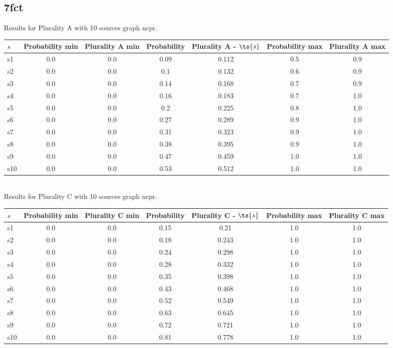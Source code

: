 \documentclass{article}
\begin{document}
\newpage

\subsection{7fct}

\noindent Results for Plurality A with 10 sources graph ncpr.

\noindent\begin{tabular}{|l|c|c|c|c|c|c|}
\hline
$s$& Probability min & Plurality A min & Probability & Plurality A - $\ts{s}$ & Probability max & Plurality A max\\
\hline
s1 &0.0 & 0.0 & 0.09 & 0.112 & 0.5 & 0.9\\
\hline
s2 &0.0 & 0.0 & 0.1 & 0.132 & 0.6 & 0.9\\
\hline
s3 &0.0 & 0.0 & 0.14 & 0.168 & 0.7 & 0.9\\
\hline
s4 &0.0 & 0.0 & 0.16 & 0.183 & 0.7 & 1.0\\
\hline
s5 &0.0 & 0.0 & 0.2 & 0.225 & 0.8 & 1.0\\
\hline
s6 &0.0 & 0.0 & 0.27 & 0.289 & 0.9 & 1.0\\
\hline
s7 &0.0 & 0.0 & 0.31 & 0.323 & 0.9 & 1.0\\
\hline
s8 &0.0 & 0.0 & 0.38 & 0.395 & 0.9 & 1.0\\
\hline
s9 &0.0 & 0.0 & 0.47 & 0.459 & 1.0 & 1.0\\
\hline
s10 &0.0 & 0.0 & 0.53 & 0.512 & 1.0 & 1.0\\
\hline
\end{tabular}\\

\noindent Results for Plurality C with 10 sources graph ncpr.

\noindent\begin{tabular}{|l|c|c|c|c|c|c|}
\hline
$s$& Probability min & Plurality C min & Probability & Plurality C - $\ts{s}$ & Probability max & Plurality C max\\
\hline
s1 &0.0 & 0.0 & 0.15 & 0.21 & 1.0 & 1.0\\
\hline
s2 &0.0 & 0.0 & 0.18 & 0.243 & 1.0 & 1.0\\
\hline
s3 &0.0 & 0.0 & 0.24 & 0.298 & 1.0 & 1.0\\
\hline
s4 &0.0 & 0.0 & 0.28 & 0.332 & 1.0 & 1.0\\
\hline
s5 &0.0 & 0.0 & 0.35 & 0.398 & 1.0 & 1.0\\
\hline
s6 &0.0 & 0.0 & 0.43 & 0.468 & 1.0 & 1.0\\
\hline
s7 &0.0 & 0.0 & 0.52 & 0.549 & 1.0 & 1.0\\
\hline
s8 &0.0 & 0.0 & 0.63 & 0.645 & 1.0 & 1.0\\
\hline
s9 &0.0 & 0.0 & 0.72 & 0.721 & 1.0 & 1.0\\
\hline
s10 &0.0 & 0.0 & 0.81 & 0.778 & 1.0 & 1.0\\
\hline
\end{tabular}\\
\end{document}
